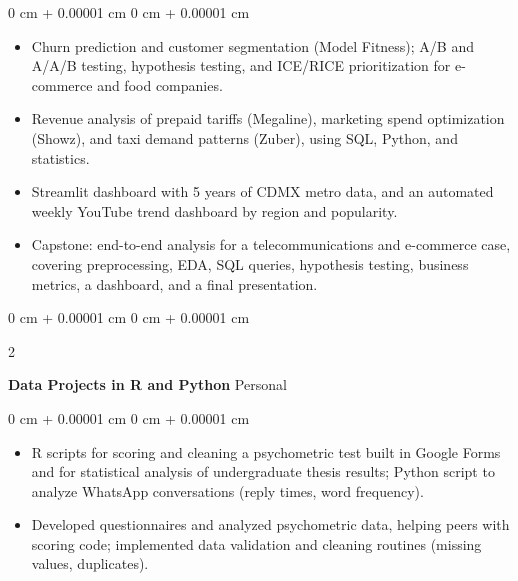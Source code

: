 \documentclass[10pt, a4paper]{article}
\newenvironment{highlights}{
    \begin{itemize}[
        topsep=0.10 cm,
        parsep=0.10 cm,
        partopsep=0pt,
        itemsep=0pt,
        leftmargin=0 cm + 10pt
    ]
}{
    \end{itemize}
} %
\newenvironment{onecolentry}{
    \begin{adjustwidth}{
        0 cm + 0.00001 cm
    }{
        0 cm + 0.00001 cm
    }
}{
    \end{adjustwidth}
} %
\newenvironment{twocolentry}[2][]{
    \onecolentry
    \def\secondColumn{#2}
    \setcolumnwidth{\fill, 4.5 cm}
    \begin{paracol}{2}
}{
    \switchcolumn \raggedleft \secondColumn
    \end{paracol}
    \endonecolentry
} %
\begin{document}
        \vspace{0.10 cm}
        \begin{onecolentry}
            \begin{highlights}
                \item Churn prediction and customer segmentation (Model Fitness); A/B and A/A/B testing, hypothesis testing, and ICE/RICE prioritization for e-commerce and food companies.
                \item Revenue analysis of prepaid tariffs (Megaline), marketing spend optimization (Showz), and taxi demand patterns (Zuber), using SQL, Python, and statistics.
                \item Streamlit dashboard with 5 years of CDMX metro data, and an automated weekly YouTube trend dashboard by region and popularity.
                \item Capstone: end-to-end analysis for a telecommunications and e-commerce case, covering preprocessing, EDA, SQL queries, hypothesis testing, business metrics, a dashboard, and a final presentation.
            \end{highlights}
        \end{onecolentry}

        \vspace{0.2 cm}

    \begin{twocolentry}{
            Personal
        }
        \textbf{Data Projects in R and Python}\end{twocolentry}

        \vspace{0.10 cm}
        \begin{onecolentry}
            \begin{highlights}
                \item R scripts for scoring and cleaning a psychometric test built in Google Forms and for statistical analysis of undergraduate thesis results; Python script to analyze WhatsApp conversations (reply times, word frequency).
                \item Developed questionnaires and analyzed psychometric data, helping peers with scoring code; implemented data validation and cleaning routines (missing values, duplicates).
            \end{highlights}
        \end{onecolentry}
\end{document}
